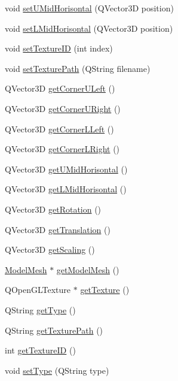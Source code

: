 \begin{DoxyCompactItemize}
\item 
void \hyperlink{class_visual_object_ad549b89d0ec63e529b3b05e05de0834b}{set\+U\+Mid\+Horisontal} (Q\+Vector3\+D position)
\item 
void \hyperlink{class_visual_object_ab04d431ba7d04c2638fd59ea60c0494a}{set\+L\+Mid\+Horisontal} (Q\+Vector3\+D position)
\item 
void \hyperlink{class_visual_object_a03c510fafe44590c3da1b37bd59c63e2}{set\+Texture\+I\+D} (int index)
\item 
void \hyperlink{class_visual_object_adb56b176fac116ce15e3052a7dfda9a5}{set\+Texture\+Path} (Q\+String filename)
\item 
Q\+Vector3\+D \hyperlink{class_visual_object_a4da6962d7f45f75dae8dccc7c95fcde6}{get\+Corner\+U\+Left} ()
\item 
Q\+Vector3\+D \hyperlink{class_visual_object_a0b6538a1ff91f4ee3656a7a59acec131}{get\+Corner\+U\+Right} ()
\item 
Q\+Vector3\+D \hyperlink{class_visual_object_a396157340bb6bbe35579f08f5e632771}{get\+Corner\+L\+Left} ()
\item 
Q\+Vector3\+D \hyperlink{class_visual_object_a03b6a5ca53a328df8d729e935ffbc501}{get\+Corner\+L\+Right} ()
\item 
Q\+Vector3\+D \hyperlink{class_visual_object_a58ee6a3048ae3e7d86abf8a34e909e5a}{get\+U\+Mid\+Horisontal} ()
\item 
Q\+Vector3\+D \hyperlink{class_visual_object_adc1c5ac4d73c139745dcb1496497127b}{get\+L\+Mid\+Horisontal} ()
\item 
Q\+Vector3\+D \hyperlink{class_visual_object_af12cba564798aa84e877084a4766dfaa}{get\+Rotation} ()
\item 
Q\+Vector3\+D \hyperlink{class_visual_object_a57dba5803c501bdca908fcc29f750b62}{get\+Translation} ()
\item 
Q\+Vector3\+D \hyperlink{class_visual_object_a989a2b5398e2ced7cc3ad5686b9da2ce}{get\+Scaling} ()
\item 
\hyperlink{class_model_mesh}{Model\+Mesh} $\ast$ \hyperlink{class_visual_object_aea5c818980cd121dec181ae07a582452}{get\+Model\+Mesh} ()
\item 
Q\+Open\+G\+L\+Texture $\ast$ \hyperlink{class_visual_object_a12a32b8182d34a8f2d6c40b871d644c8}{get\+Texture} ()
\item 
Q\+String \hyperlink{class_visual_object_a96b679b4dee487e0822722f76435a96b}{get\+Type} ()
\item 
Q\+String \hyperlink{class_visual_object_a0cdd5e5f6b20d12f664c46ce844f1b6e}{get\+Texture\+Path} ()
\item 
int \hyperlink{class_visual_object_a60f65f7cbc6e6e34a7d6c88c6902216e}{get\+Texture\+I\+D} ()
\item 
void \hyperlink{class_visual_object_a1ab21434d8c97643f9ff808f1bbf3703}{set\+Type} (Q\+String type)
\end{DoxyCompactItemize}


